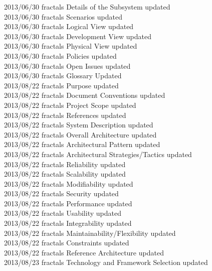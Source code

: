 \documentclass[29pt,a4paper]{moderncv}
\begin{document}
\begin{tabbing}
2013/06/30  \> fractals \>Details of the Subsystem updated\\
2013/06/30  \> fractals \>Scenarios updated\\
2013/06/30  \> fractals \>Logical View updated\\
2013/06/30  \> fractals \>Development View updated\\
2013/06/30  \> fractals \>Physical View updated\\
2013/06/30  \> fractals \>Policies updated\\
2013/06/30  \> fractals \>Open Issues updated\\
2013/06/30  \> fractals \>Glossary Updated\\
2013/08/22  \>fractals \> Purpose updated\\
2013/08/22  \> fractals \>Document Conventions updated\\
2013/08/22  \> fractals \>Project Scope updated\\
2013/08/22  \> fractals \>References updated\\
2013/08/22  \> fractals \>System Description updated\\
2013/08/22  \> fractals \>Overall Architecture updated\\ 
2013/08/22  \>fractals \> Architectural Pattern updated\\	
2013/08/22  \> fractals \>Architectural Strategies/Tactics updated\\
2013/08/22  \> fractals \>Reliability updated\\
2013/08/22  \> fractals \>Scalability updated\\
2013/08/22  \> fractals \>Modifiability updated\\
2013/08/22  \> fractals \>Security updated\\
2013/08/22  \> fractals \>Performance updated\\
2013/08/22  \> fractals \>Usability updated\\
2013/08/22  \>fractals \> Integrability updated\\
2013/08/22  \>fractals \> Maintainability/Flexibility updated\\
2013/08/22  \>fractals \> Constraints updated\\
2013/08/22  \>fractals \> Reference Architecture updated\\
2013/08/23  \>fractals \> Technology and Framework Selection updated\\

\end{tabbing}
\end{document}

